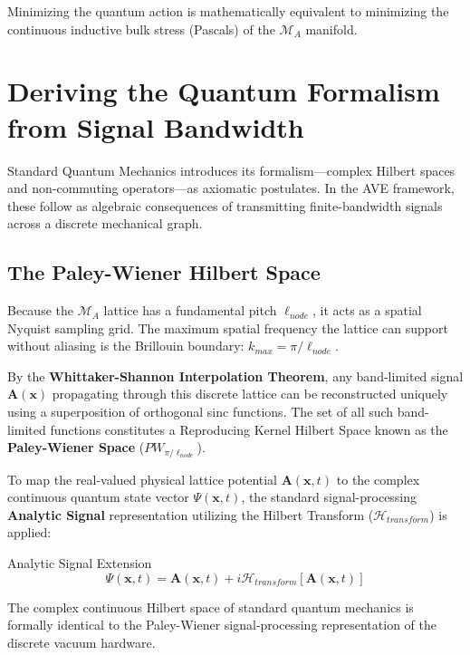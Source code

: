 Minimizing the quantum action is mathematically equivalent to minimizing the continuous
inductive bulk stress (Pascals) of the $\mathcal{M}_{A}$ manifold.

\section{Deriving the Quantum Formalism from Signal Bandwidth}
Standard Quantum Mechanics introduces its formalism---complex Hilbert spaces and non-commuting operators---as axiomatic postulates\cite{feynman1964}. In the AVE framework, these follow as algebraic consequences of transmitting finite-bandwidth signals across a discrete mechanical graph.

\subsection{The Paley-Wiener Hilbert Space}
Because the $\mathcal{M}_A$ lattice has a fundamental pitch $\ell_{node}$, it acts as a spatial Nyquist sampling grid\cite{nyquist1928}. The maximum spatial frequency the lattice can support without aliasing is the Brillouin boundary: $k_{max} = \pi / \ell_{node}$.

By the \textbf{Whittaker-Shannon Interpolation Theorem}, any band-limited signal $\mathbf{A}(\mathbf{x})$ propagating through this discrete lattice can be reconstructed uniquely using a superposition of orthogonal sinc functions\cite{shannon1949}. The set of all such band-limited functions constitutes a Reproducing Kernel Hilbert Space known as the \textbf{Paley-Wiener Space} ($PW_{\pi/\ell_{node}}$).

To map the real-valued physical lattice potential $\mathbf{A}(\mathbf{x},t)$ to the complex continuous quantum state vector $\Psi(\mathbf{x},t)$, the standard signal-processing \textbf{Analytic Signal} representation utilizing the Hilbert Transform ($\mathcal{H}_{transform}$) is applied:
\begin{resultbox}{Analytic Signal Extension}
\begin{equation}
    \Psi(\mathbf{x},t) = \mathbf{A}(\mathbf{x},t) + i \mathcal{H}_{transform}[\mathbf{A}(\mathbf{x},t)]
\end{equation}
\end{resultbox}
The complex continuous Hilbert space of standard quantum mechanics is formally identical to the Paley-Wiener signal-processing representation of the discrete vacuum hardware.

